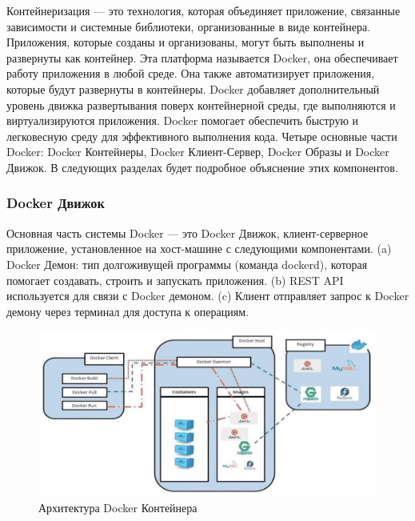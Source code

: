 \documentclass{mirea}
\begin{document}
	Контейнеризация — это технология, которая объединяет приложение, связанные зависимости и системные библиотеки, организованные в виде контейнера. Приложения, которые созданы и организованы, могут быть выполнены и развернуты как контейнер. Эта платформа называется Docker, она обеспечивает работу приложения в любой среде. Она также автоматизирует приложения, которые будут развернуты в контейнеры. Docker добавляет дополнительный уровень движка развертывания поверх контейнерной среды, где выполняются и виртуализируются приложения. Docker помогает обеспечить быструю и легковесную среду для эффективного выполнения кода. Четыре основные части Docker: Docker Контейнеры, Docker Клиент-Сервер, Docker Образы и Docker Движок. В следующих разделах будет подробное объяснение этих компонентов.
	
	\subsubsection{Docker Движок}
	
	Основная часть системы Docker — это Docker Движок, клиент-серверное приложение, установленное на хост-машине с следующими компонентами.
	(a) Docker Демон: тип долгоживущей программы (команда dockerd), которая помогает создавать, строить и запускать приложения.
	(b) REST API используется для связи с Docker демоном.
	(c) Клиент отправляет запрос к Docker демону через терминал для доступа к операциям.
	
	
	\begin{figure}[H]
		\centering
		\includegraphics[width=\textwidth]{img1}
		\parskip=6pt
		\caption{Архитектура Docker Контейнера}
		\label{fig:pic1}
	\end{figure}
\end{document}
